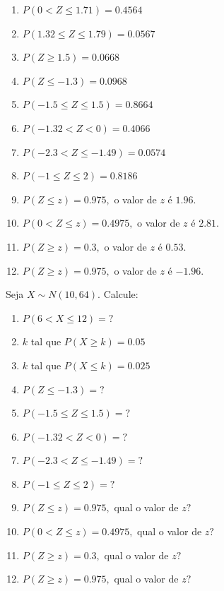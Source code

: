 \documentclass[14pt,aspectratio=1610]{beamer}
\begin{document}
\begin{frame}{}
\begin{enumerate}
\item $P(0<Z\leq 1.71)=0.4564$
\item $P(1.32\leq Z \leq 1.79)=0.0567$
\item $P(Z\geq 1.5)=0.0668$
\item $P(Z\leq -1.3)=0.0968$
\item $P(-1.5\leq Z\leq 1.5)=0.8664$
\item $P(-1.32 < Z <0)=0.4066$
\item $P(-2.3<Z\leq -1.49)=0.0574$
\item $P(-1\leq Z \leq 2)=0.8186$
\item $P(Z\leq z)=0.975,$ o valor de $z$ é $1.96.$
\item $P(0< Z \leq z)=0.4975,$ o valor de $z$ é $2.81.$
\item $P(Z\geq z)=0.3,$ o valor de $z$ é $0.53.$
\item $P(Z\geq z)=0.975,$ o valor de $z$ é $-1.96.$
\end{enumerate}
\end{frame}

\begin{frame}{}
Seja $X\sim N(10,64).$ Calcule:
\begin{enumerate}
\item $P(6<X\leq 12)=?$
\item $k$ tal que $P(X\geq k)=0.05$
\item $k$ tal que $P(X\leq k)=0.025$
\item $P(Z\leq -1.3)=?$
\item $P(-1.5\leq Z\leq 1.5)=?$
\item $P(-1.32 < Z <0)=?$
\item $P(-2.3<Z\leq -1.49)=?$
\item $P(-1\leq Z \leq 2)=?$
\item $P(Z\leq z)=0.975,$ qual o valor de $z?$
\item $P(0< Z \leq z)=0.4975,$ qual o valor de $z?$
\item $P(Z\geq z)=0.3,$ qual o valor de $z?$
\item $P(Z\geq z)=0.975,$ qual o valor de $z?$
\end{enumerate}
\end{frame}
\end{document}

